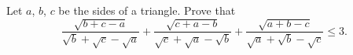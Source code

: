 Let $a$, $b$, $c$ be the sides of a triangle. Prove that
\[
\frac{\sqrt{b+c-a}}{\sqrt{b}+\sqrt{c}-\sqrt{a}}+\frac{\sqrt{c+a-b}}{\sqrt{c}+\sqrt{a}-\sqrt{b}}+\frac{\sqrt{a+b-c}}{\sqrt{a}+\sqrt{b}-\sqrt{c}}\leq 3.
\]
